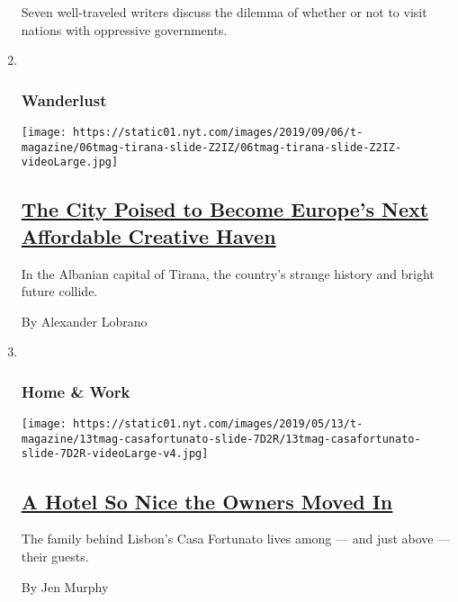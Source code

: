 \begin{enumerate}
  Seven well-traveled writers discuss the dilemma of whether or not to
  visit nations with oppressive governments.
\item ~
  \hypertarget{wanderlust}{%
  \subsubsection{Wanderlust}\label{wanderlust}}

  \texttt{[image: https://static01.nyt.com/images/2019/09/06/t-magazine/06tmag-tirana-slide-Z2IZ/06tmag-tirana-slide-Z2IZ-videoLarge.jpg]}

  \hypertarget{the-city-poised-to-become-europes-next-affordable-creative-haven}{%
  \subsection{\texorpdfstring{\href{/2019/09/06/t-magazine/tirana-albania-travel-guide.html}{The
  City Poised to Become Europe's Next Affordable Creative
  Haven}}{The City Poised to Become Europe's Next Affordable Creative Haven}}\label{the-city-poised-to-become-europes-next-affordable-creative-haven}}

  In the Albanian capital of Tirana, the country's strange history and
  bright future collide.

  By Alexander Lobrano
\item ~
  \hypertarget{home--work}{%
  \subsubsection{Home \& Work}\label{home--work}}

  \texttt{[image: https://static01.nyt.com/images/2019/05/13/t-magazine/13tmag-casafortunato-slide-7D2R/13tmag-casafortunato-slide-7D2R-videoLarge-v4.jpg]}

  \hypertarget{a-hotel-so-nice-the-owners-moved-in}{%
  \subsection{\texorpdfstring{\href{/2019/05/07/t-magazine/casa-fortunato-lisbon-hotel.html}{A
  Hotel So Nice the Owners Moved
  In}}{A Hotel So Nice the Owners Moved In}}\label{a-hotel-so-nice-the-owners-moved-in}}

  The family behind Lisbon's Casa Fortunato lives among --- and just
  above --- their guests.

  By Jen Murphy
\end{enumerate}

